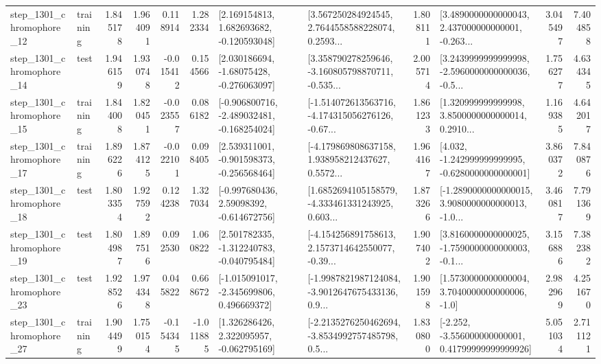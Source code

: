 \begin{tabular}{llrrrrllrlrr}
 step\_1301\_chromophore\_12 &  training &      1.845178 &    1.964091 &      0.118914 &  1.282334 &    [2.169154813, 1.682693682, -0.120593048] &  [3.567250284924545, 2.7644558588228074, 0.2593... &       1.808111 &  [3.4890000000000043, 2.437000000000001, -0.263... &            3.045497 &          7.404858 \\
 step\_1301\_chromophore\_14 &      test &      1.946159 &    1.930748 &     -0.015412 &  0.154566 &    [2.030186694, -1.68075428, -0.276063097] &  [3.358790278259646, -3.160805798870711, -0.535... &       2.005714 &  [3.2439999999999998, -2.5960000000000036, -0.5... &            1.756277 &          4.634345 \\
 step\_1301\_chromophore\_15 &  training &      1.844008 &    1.820451 &     -0.023557 &  0.086182 &  [-0.906800716, -2.489032481, -0.168254024] &  [-1.514072613563716, -4.174315056276126, -0.67... &       1.861233 &  [1.320999999999998, 3.8500000000000014, 0.2910... &            1.169385 &          4.642017 \\
 step\_1301\_chromophore\_17 &  training &      1.896226 &    1.874125 &     -0.022101 &  0.098405 &   [2.539311001, -0.901598373, -0.256568464] &  [-4.179869808637158, 1.938958212437627, 0.5572... &       1.964167 &   [4.032, -1.242999999999995, -0.6280000000000001] &            3.860372 &          7.840876 \\
 step\_1301\_chromophore\_18 &      test &      1.803354 &    1.927592 &      0.124238 &  1.327034 &    [-0.997680436, 2.59098392, -0.614672756] &  [1.6852694105158579, -4.333461331243925, 0.603... &       1.873266 &  [-1.2890000000000015, 3.9080000000000013, -1.0... &            3.460817 &          7.791369 \\
 step\_1301\_chromophore\_19 &      test &      1.804987 &    1.897516 &      0.092530 &  1.060822 &   [2.501782335, -1.312240783, -0.040795484] &  [-4.154256891758613, 2.1573714642550077, -0.39... &       1.907402 &  [3.8160000000000025, -1.7590000000000003, -0.1... &            3.156886 &          7.382382 \\
 step\_1301\_chromophore\_23 &      test &      1.928526 &    1.974348 &      0.045822 &  0.668672 &   [-1.015091017, -2.345699806, 0.496669372] &  [-1.9987821987124084, -3.9012647675433136, 0.9... &       1.901598 &     [1.5730000000000004, 3.7040000000000006, -1.0] &            2.982969 &          4.251670 \\
 step\_1301\_chromophore\_27 &  training &      1.904499 &    1.750154 &     -0.154345 & -1.011885 &    [1.326286426, 2.322095957, -0.062795169] &  [-2.2135276250462694, -3.8534992757485798, 0.5... &       1.830800 &  [-2.252, -3.556000000000001, 0.41799999999999926] &            5.051034 &          2.711121 \\

\end{tabular}
